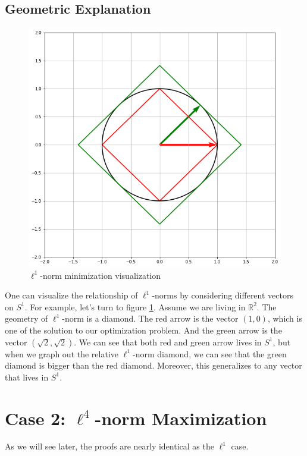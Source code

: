 \documentclass[11pt]{article}
\begin{document}
\subsection{Geometric Explanation}
    \begin{figure}[h]
        \centering
        \includegraphics[scale=0.4]{l1norm_bound.png}
        \caption{$\ell^{1}$-norm minimization visualization}
        \label{fig:l1_bound}
    \end{figure}
    One can visualize the relationship of $\ell^1$-norms by considering different vectors on $S^1$. For example, let's turn to figure \ref{fig:l1_bound}. Assume we are living in $\mathbb{R}^2$. The geometry of $\ell^1$-norm is a diamond. The red arrow is the vector $(1, 0)$, which is one of the solution to our optimization problem. And the green arrow is the vector $(\sqrt{2}, \sqrt{2})$. We can see that both red and green arrow lives in $S^1$, but when we graph out the relative $\ell^1$-norm diamond, we can see that the green diamond is bigger than the red diamond. Moreover, this generalizes to any vector that lives in $S^1$. 


\section{Case 2: $\ell^4$-norm Maximization}
	As we will see later, the proofs are nearly identical as the $\ell^{1}$ case.
\end{document}
